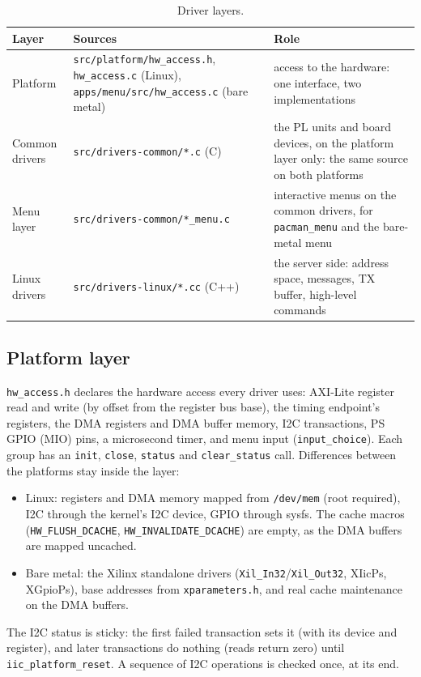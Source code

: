 \documentclass[12pt]{article}
\newcommand{\f}[1]{\texttt{#1}}
\begin{document}
\begin{table}[H]
\centering\small
\begin{tabularx}{\linewidth}{l>{\raggedright\arraybackslash}p{7cm}L}
\toprule
Layer & Sources & Role \\
\midrule
Platform & \f{src/platform/hw\_access.h}, \f{hw\_access.c} (Linux), \f{apps/menu/src/hw\_access.c}
  (bare metal) & access to the hardware:  one interface, two implementations \\
Common drivers & \f{src/drivers-common/*.c} (C) & the PL units and board devices, on the platform layer
  only:  the same source on both platforms \\
Menu layer & \f{src/drivers-common/*\_menu.c} & interactive menus on the common drivers, for
  \f{pacman\_menu} and the bare-metal menu \\
Linux drivers & \f{src/drivers-linux/*.cc} (C++) & the server side:  address space, messages, TX
  buffer, high-level commands \\
\bottomrule
\end{tabularx}
\caption{Driver layers.}
\label{tbl:layers}
\end{table}

\subsection{Platform layer}

\f{hw\_access.h} declares the hardware access every driver uses:  AXI-Lite register read and write
(by offset from the register bus base), the timing endpoint's registers, the DMA registers and DMA
buffer memory, I2C transactions, PS GPIO (MIO) pins, a microsecond timer, and menu input
(\f{input\_choice}).  Each group has an \f{init}, \f{close}, \f{status} and \f{clear\_status} call.
Differences between the platforms stay inside the layer:
\begin{itemize}
\item Linux:  registers and DMA memory mapped from \f{/dev/mem} (root required), I2C through the
  kernel's I2C device, GPIO through sysfs.  The cache macros (\f{HW\_FLUSH\_DCACHE},
  \f{HW\_INVALIDATE\_DCACHE}) are empty, as the DMA buffers are mapped uncached.
\item Bare metal:  the Xilinx standalone drivers (\f{Xil\_In32}/\f{Xil\_Out32}, XIicPs, XGpioPs), base
  addresses from \f{xparameters.h}, and real cache maintenance on the DMA buffers.
\end{itemize}
The I2C status is sticky:  the first failed transaction sets it (with its device and register), and
later transactions do nothing (reads return zero) until \f{iic\_platform\_reset}.  A sequence of I2C
operations is checked once, at its end.
\end{document}
